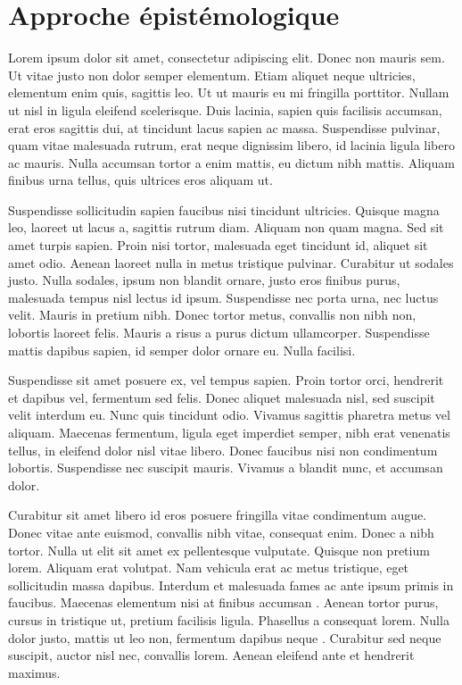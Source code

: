 \documentclass[a4paper, 11pt]{report}
\begin{document}
\section{Approche épistémologique}
Lorem ipsum dolor sit amet, consectetur adipiscing elit. Donec non mauris sem. Ut vitae justo non dolor semper elementum. Etiam aliquet neque ultricies, elementum enim quis, sagittis leo. Ut ut mauris eu mi fringilla porttitor. Nullam ut nisl in ligula eleifend scelerisque. Duis lacinia, sapien quis facilisis accumsan, erat eros sagittis dui, at tincidunt lacus sapien ac massa. Suspendisse pulvinar, quam vitae malesuada rutrum, erat neque dignissim libero, id lacinia ligula libero ac mauris. Nulla accumsan tortor a enim mattis, eu dictum nibh mattis. Aliquam finibus urna tellus, quis ultrices eros aliquam ut.

Suspendisse sollicitudin sapien faucibus nisi tincidunt ultricies. Quisque magna leo, laoreet ut lacus a, sagittis rutrum diam. Aliquam non quam magna. Sed sit amet turpis sapien. Proin nisi tortor, malesuada eget tincidunt id, aliquet sit amet odio. Aenean laoreet nulla in metus tristique pulvinar. Curabitur ut sodales justo. Nulla sodales, ipsum non blandit ornare, justo eros finibus purus, malesuada tempus nisl lectus id ipsum. Suspendisse nec porta urna, nec luctus velit. Mauris in pretium nibh. Donec tortor metus, convallis non nibh non, lobortis laoreet felis. Mauris a risus a purus dictum ullamcorper. Suspendisse mattis dapibus sapien, id semper dolor ornare eu. Nulla facilisi.

Suspendisse sit amet posuere ex, vel tempus sapien. Proin tortor orci, hendrerit et dapibus vel, fermentum sed felis. Donec aliquet malesuada nisl, sed suscipit velit interdum eu. Nunc quis tincidunt odio. Vivamus sagittis pharetra metus vel aliquam. Maecenas fermentum, ligula eget imperdiet semper, nibh erat venenatis tellus, in eleifend dolor nisl vitae libero. Donec faucibus nisi non condimentum lobortis. Suspendisse nec suscipit mauris. Vivamus a blandit nunc, et accumsan dolor.

Curabitur sit amet libero id eros posuere fringilla vitae condimentum augue. Donec vitae ante euismod, convallis nibh vitae, consequat enim. Donec a nibh tortor. Nulla ut elit sit amet ex pellentesque vulputate. Quisque non pretium lorem. Aliquam erat volutpat. Nam vehicula erat ac metus tristique, eget sollicitudin massa dapibus. Interdum et malesuada fames ac ante ipsum primis in faucibus. Maecenas elementum nisi at finibus accumsan \citet[pp. 132-137]{esl}. Aenean tortor purus, cursus in tristique ut, pretium facilisis ligula. Phasellus a consequat lorem. Nulla dolor justo, mattis ut leo non, fermentum dapibus neque \citep[pp. 132-137]{esl}. Curabitur sed neque suscipit, auctor nisl nec, convallis lorem. Aenean eleifend ante et hendrerit maximus.
\end{document}
